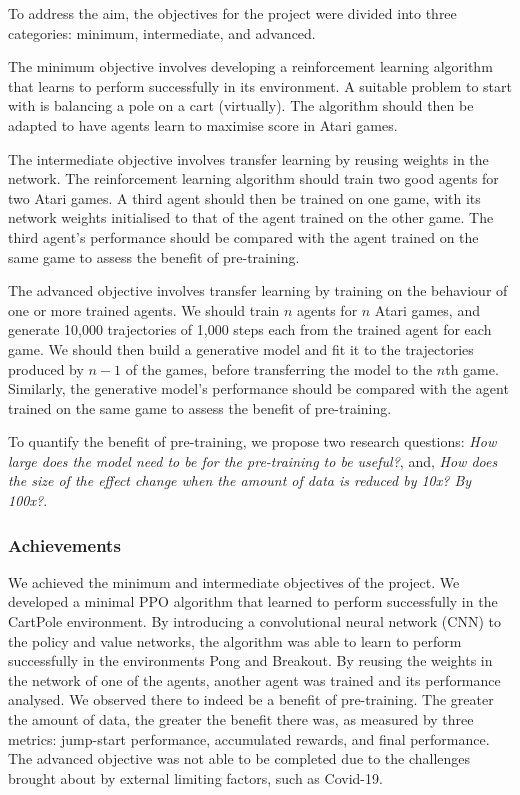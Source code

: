 \documentclass[12pt,a4paper]{article}
\begin{document}
To address the aim, the objectives for the project were divided into three categories: minimum, intermediate, and advanced. 

The minimum objective involves developing a reinforcement learning algorithm that learns to perform successfully in its environment. A suitable problem to start with is balancing a pole on a cart (virtually). The algorithm should then be adapted to have agents learn to maximise score in Atari games.

The intermediate objective involves transfer learning by reusing weights in the network. The reinforcement learning algorithm should train two good agents for two Atari games. A third agent should then be trained on one game, with its network weights initialised to that of the agent trained on the other game. The third agent's performance should be compared with the agent trained on the same game to assess the benefit of pre-training.

The advanced objective involves transfer learning by training on the behaviour of one or more trained agents. We should train $n$ agents for $n$ Atari games, and generate 10,000 trajectories of 1,000 steps each from the trained agent for each game. We should then build a generative model and fit it to the trajectories produced by $n-1$ of the games, before transferring the model to the $n$th game. Similarly, the generative model's performance should be compared with the agent trained on the same game to assess the benefit of pre-training.

To quantify the benefit of pre-training, we propose two research questions: \textit{How large does the model need to be for the pre-training to be useful?}, and, \textit{How does the size of the effect change when the amount of data is reduced by 10x? By 100x?}.

\subsubsection{Achievements}
We achieved the minimum and intermediate objectives of the project. We developed a minimal PPO algorithm that learned to perform successfully in the CartPole environment. By introducing a convolutional neural network (CNN) to the policy and value networks, the algorithm was able to learn to perform successfully in the environments Pong and Breakout. By reusing the weights in the network of one of the agents, another agent was trained and its performance analysed. We observed there to indeed be a benefit of pre-training. The greater the amount of data, the greater the benefit there was, as measured by three metrics: jump-start performance, accumulated rewards, and final performance. The advanced objective was not able to be completed due to the challenges brought about by external limiting factors, such as Covid-19. 
\end{document}
